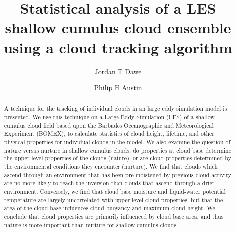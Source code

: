 \documentclass[acp]{copernicus}
\begin{document}
\title{Statistical analysis of a LES shallow cumulus cloud ensemble using a 
cloud tracking algorithm}


\author[1]{Jordan T Dawe}
\author[1]{Philip H Austin}










\received{}
\pubdiscuss{} %
\revised{}
\accepted{}
\published{}




\maketitle



\begin{abstract}
A technique for the tracking of individual clouds in an large eddy simulation 
model is presented.  We use this technique on a Large Eddy Simulation (LES) of 
a shallow cumulus cloud field based upon the Barbados Oceanographic and 
Meteorological Experiment (BOMEX), to calculate statistics of cloud height, 
lifetime, and other physical properties for individual clouds in the model.  We 
also examine the question of nature versus nurture in shallow cumulus clouds: 
do properties at cloud base determine the upper-level properties of the clouds 
(nature), or are cloud properties determined by the environmental conditions 
they encounter (nurture).  We find that clouds which ascend through an 
environment that has been pre-moistened by previous cloud activity are no more 
likely to reach the inversion than clouds that ascend through a drier 
environment.  Conversely, we find that cloud base moisture and liquid-water 
potential temperature are largely uncorrelated with upper-level cloud 
properties, but that the area of the cloud base influences cloud buoyancy and 
maximum cloud height.  We conclude that cloud properties are primarily 
influenced by cloud base area, and thus nature is more important than nurture 
for shallow cumulus clouds.
\end{abstract}
\end{document}
